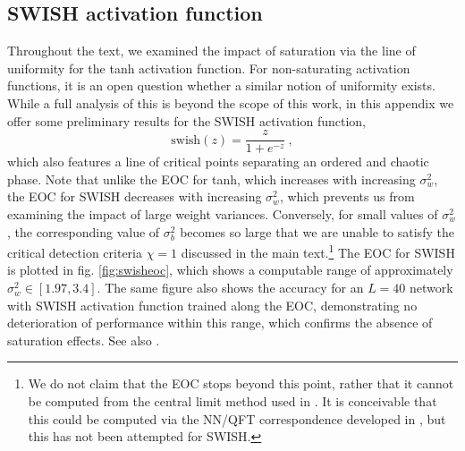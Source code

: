 \subsection{SWISH activation function}\label{app:swish}

Throughout the text, we examined the impact of saturation via the line of uniformity for the tanh activation function. For non-saturating activation functions, it is an open question whether a similar notion of uniformity exists. While a full analysis of this is beyond the scope of this work, in this appendix we offer some preliminary results for the SWISH activation function,
\begin{equation}
	\mathrm{swish}(z)=\frac{z}{1+e^{-z}}~,
\end{equation}
which also features a line of critical points separating an ordered and chaotic phase. Note that unlike the EOC for tanh, which increases with increasing $\sigma_w^2$, the EOC for SWISH decreases with increasing $\sigma_w^2$, which prevents us from examining the impact of large weight variances. Conversely, for small values of $\sigma_w^2$, the corresponding value of $\sigma_b^2$ becomes so large that we are unable to satisfy the critical detection criteria $\chi=1$ discussed in the main text.\footnote{We do not claim that the EOC stops beyond this point, rather that it cannot be computed from the central limit method used in \cite{arxiv.1606.05340, 2016arXiv161101232S}. It is conceivable that this could be computed via the NN/QFT correspondence developed in \cite{Grosvenor:2021eol}, but this has not been attempted for SWISH.} The EOC for SWISH is plotted in fig. \ref{fig:swisheoc}, which shows a computable range of approximately $\sigma_w^2\in[1.97,3.4]$. The same figure also shows the accuracy for an $L=40$ network with SWISH activation function trained along the EOC, demonstrating no deterioration of performance within this range, which confirms the absence of saturation effects. See also \cite{2018arXiv180508266H,pmlr-v97-hayou19a}.

